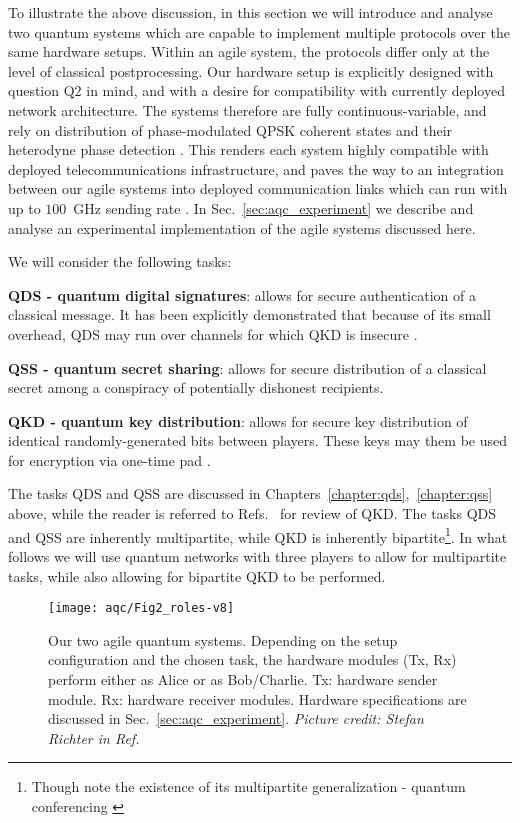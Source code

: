 To illustrate the above discussion, in this section we will introduce and analyse two quantum systems which are capable to implement multiple protocols over the same hardware setups. Within an agile system, the protocols differ only at the level of classical postprocessing. Our hardware setup is explicitly designed with question Q$2$ in mind, and with a desire for compatibility with currently deployed network architecture. The systems therefore are fully continuous-variable, and rely on distribution of phase-modulated QPSK coherent states and their heterodyne phase detection \cite{Agrawal2008}. This renders each system highly compatible with deployed telecommunications infrastructure, and paves the way to an integration between our agile systems into deployed communication links which can run with up to $100$~GHz sending rate \cite{Khan2015, Khan2016}. In Sec.~\ref{sec:aqc_experiment} we describe and analyse an experimental implementation of the agile systems discussed here.

We will consider the following tasks:

\textbf{QDS - quantum digital signatures}: allows for secure authentication of a classical message. It has been explicitly demonstrated that because of its small overhead, QDS may run over channels for which QKD is insecure \cite{Amiri2016}.

\textbf{QSS - quantum secret sharing}: allows for secure distribution of a classical secret among a conspiracy of potentially dishonest recipients.

\textbf{QKD - quantum key distribution}: allows for secure key distribution of identical randomly-generated bits between players. These keys may them be used for encryption via one-time pad \cite{Bennett1984, Schneier1996}.

The tasks QDS and QSS are discussed in Chapters~\ref{chapter:qds},~\ref{chapter:qss} above, while the reader is referred to Refs.~\cite{Laudenbach2017, Scarani2009} for review of QKD. The tasks QDS and QSS are inherently multipartite, while QKD is inherently bipartite\footnote{Though note the existence of its multipartite generalization - quantum conferencing \cite{Ottaviani2017b, Ottaviani2019}}. In what follows we will use quantum networks with three players to allow for multipartite tasks, while also allowing for bipartite QKD to be performed.

\begin{figure}[htp]
\captionsetup{width=0.8\linewidth}
\centering
\texttt{[image: aqc/Fig2\_roles-v8]}
\caption{\label{fig:agile_tasks} Our two agile quantum systems. Depending on the setup configuration and the chosen task, the hardware modules (Tx, Rx) perform either as Alice or as Bob/Charlie. Tx: hardware sender module. Rx: hardware receiver modules. Hardware specifications are discussed in Sec.~\ref{sec:aqc_experiment}. \emph{Picture credit: Stefan Richter in Ref.~\cite{Richter2020}}}
\end{figure}


